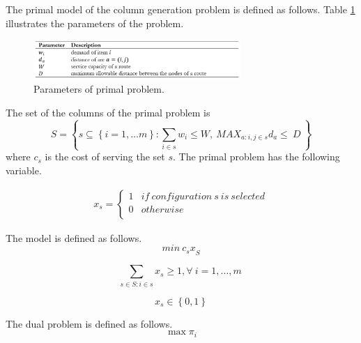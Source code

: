 The primal model of the column generation problem is defined as follows. Table \ref{tab_CG_dist} illustrates the parameters of the problem.

\begin{figure}[hbt!]
\centering
\includegraphics[width=0.7\textwidth]{SectionDistribution/design_figures/tab_CG_dist.png}
\captionsetup{type=table}
\caption{Parameters of primal problem.}
\label{tab_CG_dist}
\end{figure}

The set of the columns of the primal problem is
\begin{equation}
    S=\left\{s\subseteq\left\{i=1,\ldots m\right\}:\sum_{i\in s}{w_i\le W},\ {MAX_{a:i,j\in s}{d}_a\le\ D}\ \right\}
\end{equation}
where $c_s$ is the cost of serving the set $s$. The primal problem has the following variable.

\begin{equation}
   \begin{split}
   x_{s}=\left\{
                \begin{array}{ll}
                  1 & if\ configuration\ s\ is\ selected \\
                  0 & otherwise\\
                \end{array}
              \right.
   \end{split}
\end{equation}

The model is defined as follows.
\begin{equation}
    min\ {c_sx}_S
\end{equation}

\begin{equation}
    \sum_{s\in S:i\in s}{x_s\geq1} , \forall\ i=1,\ldots,m\ 
\end{equation}

\begin{equation}
    x_s\in\left\{0,1\right\} 
\end{equation}

The dual problem is defined as follows.
\begin{equation}
    \max{\pi_i}
\end{equation}

